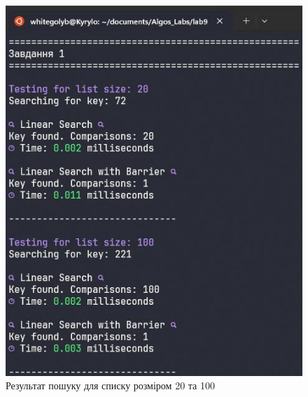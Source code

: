 \begin{figure}[h!]
    \centering
    \includegraphics[width=15cm]{reports/algos/lab9/assets/1.jpeg}
    \caption{Результат пошуку для списку розміром 20 та 100}
\end{figure}

